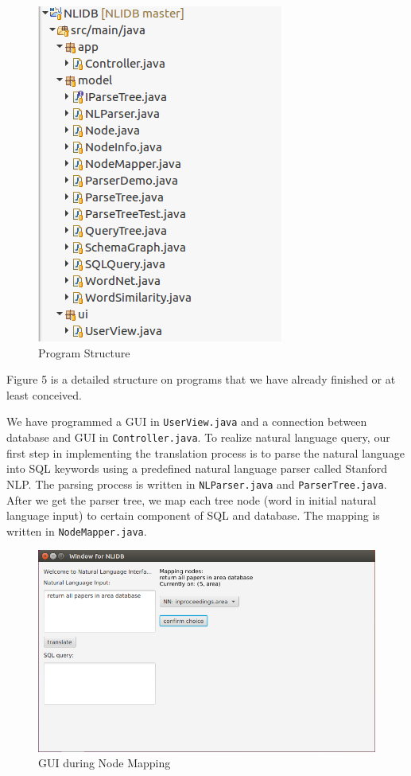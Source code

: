 \documentclass[twocolumn]{article}
\begin{document}
\begin{figure}[ht]
  \centering
  \includegraphics[width=0.8\linewidth]{figures/program_structure.png}
  \caption{Program Structure}
\end{figure}
  
Figure 5 is a detailed structure on programs that we have already finished or at least conceived.

We have programmed a GUI in \texttt{UserView.java} and a connection between database and GUI in \texttt{Controller.java}. To realize natural language query, our first step in implementing the translation process is to parse the natural language into SQL keywords using a predefined natural language parser called Stanford NLP. The parsing process is written in \texttt{NLParser.java} and \texttt{ParserTree.java}. After we get the parser tree, we map each tree node (word in initial natural language input) to certain component of SQL and database. The mapping is written in \texttt{NodeMapper.java}.

\begin{figure}[ht]
  \centering
  \includegraphics[width=0.7\linewidth]{figures/gui_nodes_mapping.png}
  \caption{GUI during Node Mapping}
\end{figure}
\end{document}
